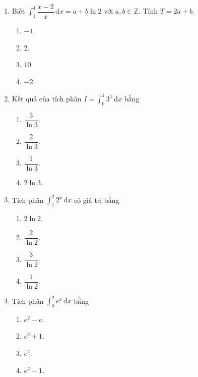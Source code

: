 \documentclass[12pt]{article}
\begin{document}
\begin{enumerate}[label=\textbf{Câu \arabic*.}]
		\item Biết $\displaystyle \int_1^4 \dfrac{x - 2}{x}\,\mathrm{d}x = a + b\ln 2$ với $a, b \in \mathbb{Z}$. Tính $T = 2a + b$.
		\begin{multicols}{4}
			\begin{enumerate}[label=\textbf{\Alph*.}]
				\item $-1$.
				\item $2$.
				\item $10$.
				\item $-2$.
			\end{enumerate}
		\end{multicols}
		
		\item Kết quả của tích phân $I = \displaystyle \int_0^1 3^x\,\mathrm{d}x$ bằng
		\begin{multicols}{4}
			\begin{enumerate}[label=\textbf{\Alph*.}]
				\item $\dfrac{3}{\ln 3}$.
				\item $\dfrac{2}{\ln 3}$.
				\item $\dfrac{1}{\ln 3}$.
				\item $2\ln 3$.
			\end{enumerate}
		\end{multicols}
		
		\item Tích phân $\displaystyle \int_1^2 2^x\,\mathrm{d}x$ có giá trị bằng
		\begin{multicols}{4}
			\begin{enumerate}[label=\textbf{\Alph*.}]
				\item $2\ln 2$.
				\item $\dfrac{2}{\ln 2}$.
				\item $\dfrac{3}{\ln 2}$.
				\item $\dfrac{1}{\ln 2}$.
			\end{enumerate}
		\end{multicols}
		
		\item Tích phân $\displaystyle \int_0^2 e^x\,\mathrm{d}x$ bằng
		\begin{multicols}{4}
			\begin{enumerate}[label=\textbf{\Alph*.}]
				\item $e^2 - e$.
				\item $e^2 + 1$.
				\item $e^2$.
				\item $e^2 - 1$.
			\end{enumerate}
		\end{multicols}
		

\end{enumerate}
\end{document}
